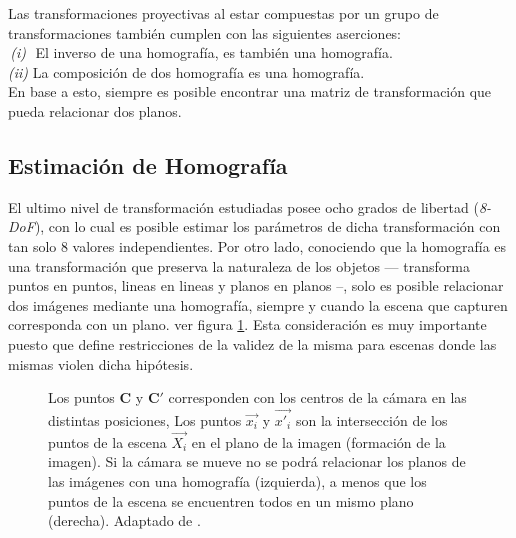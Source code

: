 Las transformaciones proyectivas al estar compuestas por un grupo de transformaciones  también cumplen con las siguientes aserciones: \\
\textit{$\,$(i)$\,\,$}  El inverso de una homografía, es también una homografía.\\
\textit{(ii)} La composición de dos homografía es una homografía.\\
En base a esto, siempre es posible encontrar una matriz de transformación que pueda relacionar dos planos.


\subsection{Estimación de Homografía}

El ultimo nivel de transformación estudiadas posee ocho grados de libertad (\textit{8-DoF}), con lo cual es posible estimar los parámetros de dicha transformación con tan solo 8 valores independientes. Por otro lado, conociendo que la homografía es una transformación que preserva la naturaleza de los objetos --- transforma puntos en puntos, lineas en lineas y planos en planos --, solo es posible relacionar dos imágenes mediante una homografía, siempre y cuando la escena que capturen corresponda con un plano. ver figura \ref{imagen:planos}. Esta consideración es muy importante puesto que define restricciones de la validez de la misma para escenas donde las mismas violen dicha hipótesis.


\begin{figure}[h]
	\centering     %
	\hspace{5mm}%
	\caption[Relacion de homografías]{Los puntos $\mathbf{C}$ y $\mathbf{C'}$ corresponden con los centros de la cámara en las distintas posiciones, Los puntos $\vec{x_i}$ y $\vec{x'_i}$ son la intersección de los puntos de la escena $\vec{X_i}$ en el plano de la imagen (formación de la imagen). Si la cámara se mueve no se podrá relacionar los planos de las imágenes con una homografía (izquierda), a menos que los puntos de la escena se encuentren todos en un mismo plano (derecha). Adaptado de \cite{zisserman}.}
	\label{imagen:planos}
\end{figure}

